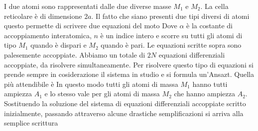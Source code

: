 \documentclass[a4paper,12pt]{article}
\begin{document}
\begin{center}
\end{center}
I due atomi sono rappresentati dalle due diverse masse $M_1$ e $M_2$. La cella reticolare è di dimensione $2a$. Il fatto che siano presenti due tipi diversi di atomi questo permette di scrivere due equazioni del moto 
Dove $\alpha$ è la costante di accoppiamento interatomica, $n$ è un indice intero e scorre su tutti gli atomi di tipo $M_1$ quando è dispari e $M_2$ quando è pari. Le equazioni scritte sopra sono palesemente accoppiate. Abbiamo un totale di $2N$ equazioni differenziali accoppiate, da risolvere simultaneamente. Per risolvere questo tipo di equazioni si prende sempre in cosiderazione il sistema in studio e si formula un'Ansazt. Quella più attendibile è 
In questo modo tutti gli atomi di massa $M_1$ hanno tutti ampiezza $A_1$ e lo stesso vale per gli atomi di massa $M_2$ che hanno ampiezza $A_2$. Sostituendo la soluzione del sistema di equazioni differenziali accoppiate scritto inizialmente, passando attraverso alcune drastiche semplificazioni si arriva alla semplice scrittura
\end{document}
